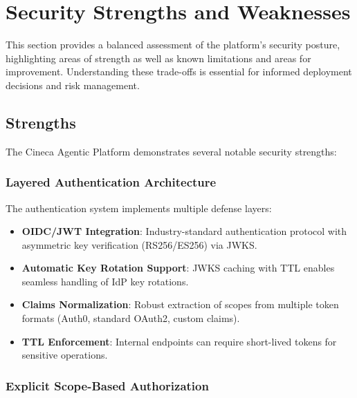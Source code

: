 
\section{Security Strengths and Weaknesses}
\label{sec:security-strengths-weaknesses}

This section provides a balanced assessment of the platform's security posture, highlighting areas of strength as well as known limitations and areas for improvement. Understanding these trade-offs is essential for informed deployment decisions and risk management.

\subsection{Strengths}
\label{subsec:security-strengths}

The Cineca Agentic Platform demonstrates several notable security strengths:

\subsubsection{Layered Authentication Architecture}

The authentication system implements multiple defense layers:

\begin{itemize}
    \item \textbf{OIDC/JWT Integration}: Industry-standard authentication protocol with asymmetric key verification (RS256/ES256) via JWKS.
    \item \textbf{Automatic Key Rotation Support}: JWKS caching with TTL enables seamless handling of IdP key rotations.
    \item \textbf{Claims Normalization}: Robust extraction of scopes from multiple token formats (Auth0, standard OAuth2, custom claims).
    \item \textbf{TTL Enforcement}: Internal endpoints can require short-lived tokens for sensitive operations.
\end{itemize}

\subsubsection{Explicit Scope-Based Authorization}

